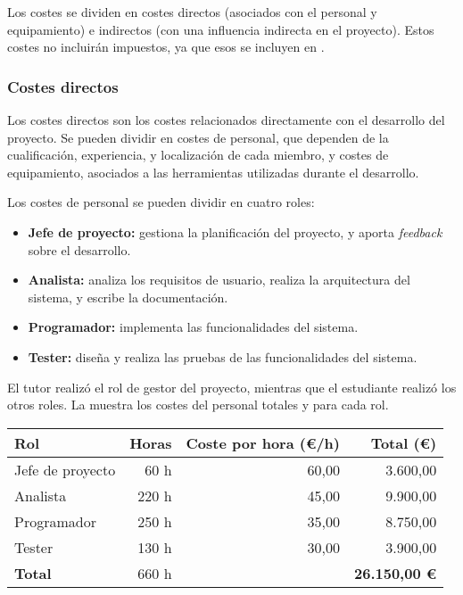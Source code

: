 \makeatother

Los costes se dividen en costes directos (asociados con el personal y
equipamiento) e indirectos (con una influencia indirecta en el proyecto). Estos
costes no incluirán impuestos, ya que esos se incluyen en
.

\subsubsection{Costes directos}

Los costes directos son los costes relacionados directamente con el desarrollo
del proyecto. Se pueden dividir en costes de personal, que dependen de la
cualificación, experiencia, y localización de cada miembro, y costes de
equipamiento, asociados a las herramientas utilizadas durante el desarrollo.

\noindent
Los costes de personal se pueden dividir en cuatro roles:

\begin{itemize}
    \item \textbf{Jefe de proyecto:} gestiona la planificación del proyecto, y aporta
    \textit{feedback} sobre el desarrollo.
    \item \textbf{Analista:} analiza los requisitos de usuario, realiza la
    arquitectura del sistema, y escribe la documentación.
    \item \textbf{Programador:} implementa las funcionalidades del sistema.
    \item \textbf{Tester:} diseña y realiza las pruebas de las funcionalidades
    del sistema.
\end{itemize}

El tutor realizó el rol de gestor del proyecto, mientras que el estudiante
realizó los otros roles. La  muestra los costes del
personal totales y para cada rol.

\begin{table}[htb]
    {
      \begin{tabular}{lrrr}
        \toprule
        \textbf{Rol} & \textbf{Horas} & \textbf{Coste por hora (\euro/h)} & \textbf{Total (\euro)} \\
        \midrule
        Jefe de proyecto &  60 h & 60,00 & 3.600,00 \\
        Analista         & 220 h & 45,00 & 9.900,00 \\
        Programador      & 250 h & 35,00 & 8.750,00 \\
        Tester           & 130 h & 30,00 & 3.900,00 \\
        \midrule
        \textbf{Total}   & 660 h &       & \textbf{26.150,00 \euro} \\
        \bottomrule
      \end{tabular}
    }
\end{table}

